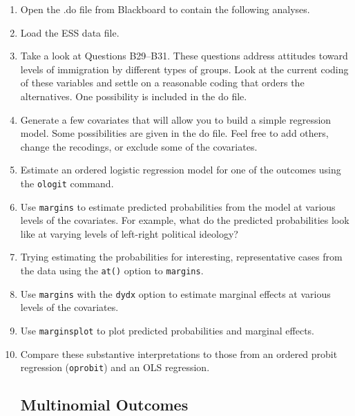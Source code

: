 \documentclass[a4paper,12pt]{article}
\begin{document}
\begin{enumerate}\itemsep0.5em

\subsection*{Ordered Outcomes}

\item Open the .do file from Blackboard to contain the following analyses.
\item Load the ESS data file.
\item Take a look at Questions B29--B31. These questions address attitudes toward levels of immigration by different types of groups. Look at the current coding of these variables and settle on a reasonable coding that orders the alternatives. One possibility is included in the do file.
\item Generate a few covariates that will allow you to build a simple regression model. Some possibilities are given in the do file. Feel free to add others, change the recodings, or exclude some of the covariates.
\item Estimate an ordered logistic regression model for one of the outcomes using the \texttt{ologit} command.
\item Use \texttt{margins} to estimate predicted probabilities from the model at various levels of the covariates. For example, what do the predicted probabilities look like at varying levels of left-right political ideology?
\item Trying estimating the probabilities for interesting, representative cases from the data using the \texttt{at()} option to \texttt{margins}.
\item Use \texttt{margins} with the \texttt{dydx} option to estimate marginal effects at various levels of the covariates.
\item Use \texttt{marginsplot} to plot predicted probabilities and marginal effects.
\item Compare these substantive interpretations to those from an ordered probit regression (\texttt{oprobit}) and an OLS regression.

\subsection*{Multinomial Outcomes}


\end{enumerate}
\end{document}
